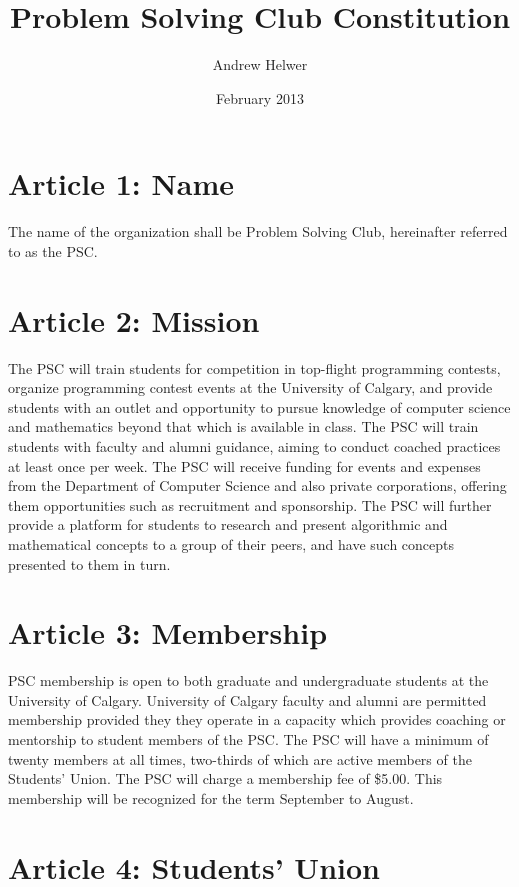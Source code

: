 \documentclass{article}
\begin{document}
\title{Problem Solving Club Constitution}
\author{Andrew Helwer}
\date{February 2013}
\maketitle

\section{Article 1: Name}

The name of the organization shall be Problem Solving Club, hereinafter referred to as the PSC.

\section{Article 2: Mission}

The PSC will train students for competition in top-flight programming contests, organize programming contest events at the University of Calgary, and provide students with an outlet and opportunity to pursue knowledge of computer science and mathematics beyond that which is available in class.
The PSC will train students with faculty and alumni guidance, aiming to conduct coached practices at least once per week. 
The PSC will receive funding for events and expenses from the Department of Computer Science and also private corporations, offering them opportunities such as recruitment and sponsorship.
The PSC will further provide a platform for students to research and present algorithmic and mathematical concepts to a group of their peers, and have such concepts presented to them in turn.

\section{Article 3: Membership}

PSC membership is open to both graduate and undergraduate students at the University of Calgary.
University of Calgary faculty and alumni are permitted membership provided they they operate in a capacity which provides coaching or mentorship to student members of the PSC.
The PSC will have a minimum of twenty members at all times, two-thirds of which are active members of the Students' Union.
The PSC will charge a membership fee of \$5.00.
This membership will be recognized for the term September to August.

\section{Article 4: Students' Union}
\end{document}
